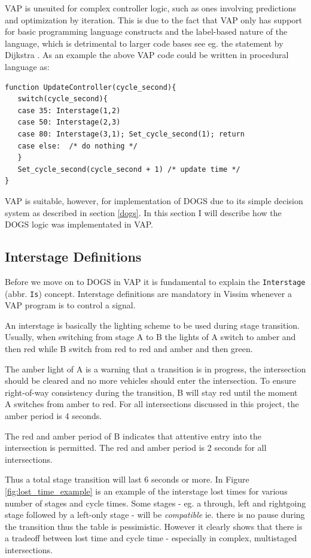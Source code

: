 VAP is unsuited for complex controller logic, such as ones involving predictions and optimization by iteration. This is due to the fact that VAP only has support for basic programming language constructs and the label-based nature of the language, which is detrimental to larger code bases see eg. the statement by Dijkstra \cite{nogoto}. As an example the above VAP code could be written in procedural language as:

\begin{verbatim}
function UpdateController(cycle_second){
   switch(cycle_second){
   case 35: Interstage(1,2)
   case 50: Interstage(2,3)
   case 80: Interstage(3,1); Set_cycle_second(1); return
   case else:  /* do nothing */
   }
   Set_cycle_second(cycle_second + 1) /* update time */
}
\end{verbatim}

VAP is suitable, however, for implementation of DOGS due to its simple decision system as described in section \ref{dogs}. In this section I will describe how the DOGS logic was implementated in VAP.

\subsection{Interstage Definitions}
Before we move on to DOGS in VAP it is fundamental to explain the \verb|Interstage| (abbr. \verb|Is|) concept. Interstage definitions are mandatory in Vissim whenever a VAP program is to control a signal.

An interstage is basically the lighting scheme to be used during stage transition. Usually, when switching from stage A to B the lights of A switch to amber and then red while B switch from red to red and amber and then green.

The amber light of A is a warning that a transition is in progress, the intersection should be cleared and no more vehicles should enter the intersection. To ensure right-of-way consistency during the transition, B will stay red until the moment A switches from amber to red. For all intersections discussed in this project, the amber period is 4 seconds.

The red and amber period of B indicates that attentive entry into the intersection is permitted. The red and amber period is 2 seconds for all intersections.

Thus a total stage transition will last 6 seconds or more. In Figure \ref{fig:lost_time_example} is an example of the interstage lost times for various number of stages and cycle times. Some stages - eg. a through, left and rightgoing stage followed by a left-only stage - will be \textit{compatible} ie. there is no pause during the transition thus the table is pessimistic. However it clearly shows that there is a tradeoff between lost time and cycle time - especially in complex, multistaged intersections.

